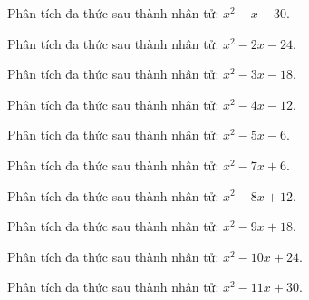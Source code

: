\begin{bt}
	Phân tích đa thức sau thành nhân tử: $x^2 - x - 30$.
\end{bt}
\begin{bt}
	Phân tích đa thức sau thành nhân tử: $x^2 - 2 x - 24$.
\end{bt}
\begin{bt}
	Phân tích đa thức sau thành nhân tử: $x^2 - 3 x - 18$.
\end{bt}
\begin{bt}
	Phân tích đa thức sau thành nhân tử: $x^2 - 4 x - 12$.
\end{bt}
\begin{bt}
	Phân tích đa thức sau thành nhân tử: $x^2 - 5 x - 6$.
\end{bt}
\begin{bt}
	Phân tích đa thức sau thành nhân tử: $x^2 - 7 x + 6$.
\end{bt}
\begin{bt}
	Phân tích đa thức sau thành nhân tử: $x^2 - 8 x + 12$.
\end{bt}
\begin{bt}
	Phân tích đa thức sau thành nhân tử: $x^2 - 9 x + 18$.
\end{bt}
\begin{bt}
	Phân tích đa thức sau thành nhân tử: $x^2 - 10 x + 24$.
\end{bt}
\begin{bt}
	Phân tích đa thức sau thành nhân tử: $x^2 - 11 x + 30$.
\end{bt}
